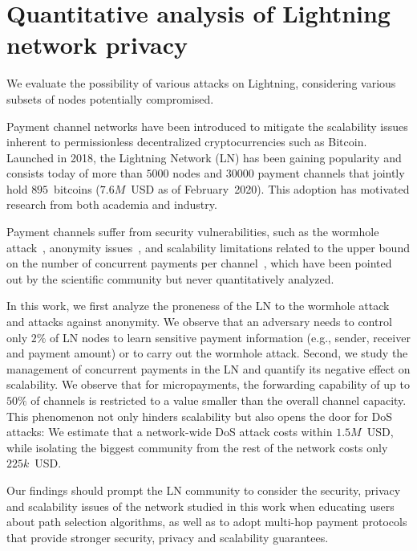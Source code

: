 \chapter{Quantitative analysis of Lightning network privacy}

\label{Chapter07_LN_attacks}

We evaluate the possibility of various attacks on Lightning, considering various subsets of nodes potentially compromised.


Payment channel networks have been introduced to mitigate the scalability issues inherent to permissionless decentralized cryptocurrencies such as Bitcoin.
Launched in 2018, the Lightning Network (LN) has 
been gaining popularity and 
consists today of more than $5000$ nodes and $30000$ payment channels 
that jointly hold $895$~bitcoins ($7.6M$~USD as of February~2020).
This adoption has motivated research from both academia and industry.

Payment channels suffer from security vulnerabilities, such as the wormhole attack~\cite{Malavolta2019}, anonymity issues~\cite{Malavolta2017}, and scalability limitations related to  the upper bound on the number of concurrent payments per channel~\cite{EmelyanenkoK2017}, which have been pointed out by the scientific community but never quantitatively analyzed. 

In this work, we first analyze the proneness of the LN to the wormhole attack and attacks against anonymity. 
We observe that an adversary needs to control only $2\%$ of LN nodes to learn sensitive payment information (e.g., sender, receiver and payment amount) or to carry out the wormhole attack. 
Second, we study the management of concurrent payments in the LN and quantify its negative effect on scalability. 
We observe that for micropayments, the forwarding capability of up to $50\%$ of channels is restricted to 
a value smaller than the overall channel capacity.
This phenomenon not only hinders scalability but also opens the door for DoS attacks: We estimate that 
a network-wide DoS attack costs within $1.5M$~USD, while isolating the biggest community from the rest of the network costs only $225k$~USD.

Our findings should prompt the LN community to consider the security, privacy and scalability issues of the network studied in this work 
when educating users about path selection algorithms, as well as to adopt multi-hop payment protocols that provide stronger security, privacy and 
scalability guarantees. 












